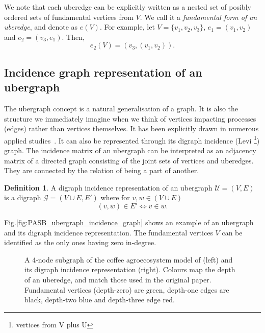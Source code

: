 \documentclass[a4paper,12pt]{article}
\theoremstyle{definition}
\newtheorem{definition}{Definition}%
\theoremstyle{remark}
\begin{document}
We note that each uberedge can be explicitly written as a nested set of posibly ordered sets of fundamental vertices from $V$. We call it a \emph{fundamental form of an uberedge}, and denote as $e(V)$. For example, let $V=\{v_1, v_2,v_3\}$, $e_1=(v_1,v_2)$ and $e_2=(v_3,e_1)$.  Then,
\begin{equation}\label{Fuedge}
    e_2(V)=(v_3, (v_1, v_2)).
\end{equation}


\subsection{Incidence graph representation of an ubergraph}
The ubergraph concept is a natural generalisation of a graph. It is also the structure we immediately imagine when we think of vertices impacting processes (edges) rather than vertices themselves. It has been explicitly drawn in numerous applied studies~\cite{Bairey2016, Moleon_scavenging}. It can also be represented through its digraph incidence (Levi \footnote{vertices from V plus U}) graph.
The incidence matrix of an ubergraph can be interpreted as an adjacency matrix of a directed graph consisting of the joint sets of vertices and uberedges.
They are connected by the relation of being a part of another.
\begin{definition}\label{uber_levi_graph}
    A digraph incidence representation of an ubergraph $\mathcal{U}=(V,E)$ is a digraph $\mathcal{G}=(V \cup E,E')$ where for $v, w \in (V \cup E)$ 
    $$(v,w) \in E' \iff v \in w. $$
 
\end{definition}

Fig.\ref{fig:PASB_ubergraph_incidence_graph} shows an example of an ubergraph and its digraph incidence representation. The fundamental vertices $V$ can be identified as the only ones having zero in-degree.
\begin{figure}[h!]
	\begin{center}
        \caption{A 4-node subgraph of the coffee agroecosystem model of \cite{GOLUBSKI2016344} (left) and its digraph incidence representation (right). Colours map the depth of an uberedge, and match those used in the original paper. Fundamental vertices (depth-zero) are green, depth-one edges are black, depth-two blue and depth-three edge red.} 
    	\label{fig:PASB_ubergraph_incidence_graph_appendix}
    \end{center}
    \end{figure}
\end{document}
